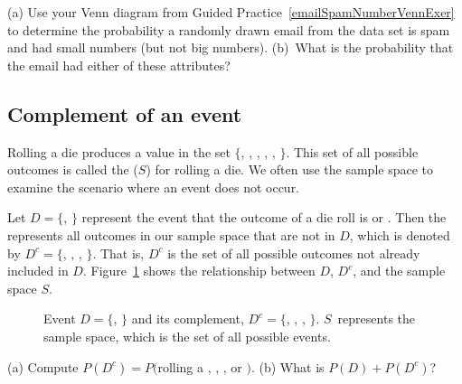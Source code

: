 \begin{exercisewrap}
\begin{nexercise}
(a) Use your Venn diagram from Guided Practice~\ref{emailSpamNumberVennExer} to determine the probability a randomly drawn email from the  data set is spam and had small numbers (but not big numbers). (b)~What is the probability that the email had either of these attributes?\footnotemark
{}
\end{nexercise}
\end{exercisewrap}


\subsection{Complement of an event}

Rolling a die produces a value in the set $\{$, , , , , $\}$. This set of all possible outcomes is called the  ($S$) for rolling a die. We often use the sample space to examine the scenario where an event does not occur.

Let $D=\{$, $\}$ represent the event that the outcome of a die roll is  or . Then the  represents all outcomes in our sample space that are not in $D$, which is denoted by $D^c = \{$, , , $\}$. That is, $D^c$ is the set of all possible outcomes not already included in $D$. Figure~\ref{complementOfD} shows the relationship between $D$, $D^c$, and the sample space $S$.

\begin{figure}[hht]
\centering
\caption{Event $D=\{$, $\}$ and its complement, $D^c = \{$, , , $\}$. $S$~represents the sample space, which is the set of all possible events.}
\label{complementOfD}
\end{figure}

\begin{exercisewrap}
\begin{nexercise}
(a) Compute $P(D^c) = P($rolling a , , , or $)$. (b) What is $P(D) + P(D^c)$?\footnotemark
\end{nexercise}
\end{exercisewrap}

